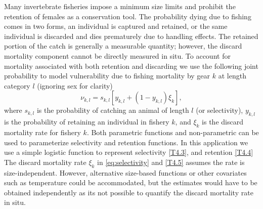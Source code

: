 \documentclass[12pt,letterpaper]{article}
\begin{document}
    Many invertebrate fisheries  impose a minimum size limits and prohibit the retention of females as a conservation tool.  The probability dying due to fishing comes in two forms, an individual is captured and retained, or the same individual is discarded and dies prematurely due to handling effects.  The retained portion of the catch is generally a measurable quantity; however, the discard mortality component cannot be directly measured in situ.  To account for mortality associated with both retention and discarding we use the following joint probability to model vulnerability due to fishing mortality by gear $k$ at length category $l$ (ignoring sex for clarity)
    \begin{equation}\label{eq:selectivity}
      \nu_{k,l}  = s_{k,l} [y_{k,l} + (1-y_{k,l})\xi_{k}],
    \end{equation}
    where $s_{k,l}$ is the probability of catching an animal of length $l$ (or selectivity), $y_{k,l}$ is the probability of retaining an individual in fishery $k$, and $\xi_{k}$ is the discard mortality rate for fishery $k$.  Both parametric functions and non-parametric can be used to parameterize selectivity and retention functions.  In this application we use a simple logistic function to represent selectivity \eqref{T4.3}, and retention \eqref{T4.4} The discard mortality rate $\xi_k$ in \eqref{eq:selectivity} and \eqref{T4.5} assumes the rate is size-independent.  However, alternative size-based functions or other covariates such as temperature could be accommodated, but the estimates would have to be obtained independently as its not possible to quantify the discard mortality rate in situ.
\end{document}
